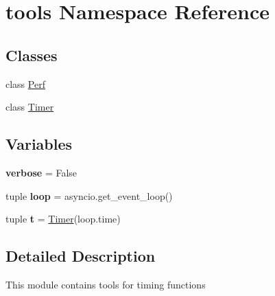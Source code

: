 \hypertarget{namespacetools}{\section{tools \-Namespace \-Reference}
\label{namespacetools}
}
\subsection*{\-Classes}
\begin{DoxyCompactItemize}
\item 
class \hyperlink{classtools_1_1_perf}{\-Perf}
\item 
class \hyperlink{classtools_1_1_timer}{\-Timer}
\end{DoxyCompactItemize}
\subsection*{\-Variables}
\begin{DoxyCompactItemize}
\item 
\hypertarget{namespacetools_aef97b064d9a4e07bfba5738b4b9596af}{{\bfseries verbose} = \-False}\label{namespacetools_aef97b064d9a4e07bfba5738b4b9596af}

\item 
\hypertarget{namespacetools_a8ecd0334cf87a5d87299ea8229edf723}{tuple {\bfseries loop} = asyncio.\-get\-\_\-event\-\_\-loop()}\label{namespacetools_a8ecd0334cf87a5d87299ea8229edf723}

\item 
\hypertarget{namespacetools_aa8a708dbe7ebc880dd6104ec3ddd4dd6}{tuple {\bfseries t} = \hyperlink{classtools_1_1_timer}{\-Timer}(loop.\-time)}\label{namespacetools_aa8a708dbe7ebc880dd6104ec3ddd4dd6}

\end{DoxyCompactItemize}


\subsection{\-Detailed \-Description}
\begin{DoxyVerb}
    This module contains tools for timing functions
\end{DoxyVerb}
 